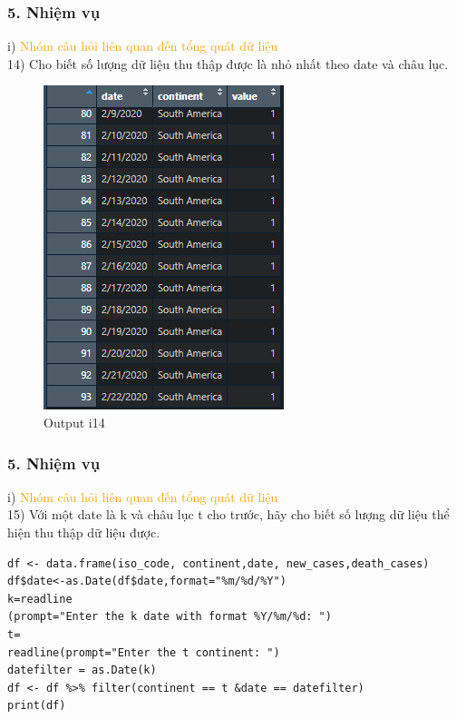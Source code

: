 \documentclass[english,10pt,table]{beamer}
\begin{document}
\begin{frame}[fragile]
\frametitle{5.  Nhiệm vụ}
	i) \textcolor{orange}{Nhóm câu hỏi liên quan đến tổng quát dữ liệu}\\
	14) Cho biết số lượng dữ liệu thu thập được là nhỏ nhất theo date và châu lục.
	\begin{figure}[h!]
	\begin{center}
		    \includegraphics[scale = 0.4]{Images/I/I14.png}
		            \caption{Output i14}
		\end{center}
		\end{figure}
\end{frame}

\begin{frame}[fragile]
\frametitle{5.  Nhiệm vụ}
	i) \textcolor{orange}{Nhóm câu hỏi liên quan đến tổng quát dữ liệu}\\
	15) Với một date là k và châu lục t cho trước, hãy cho biết số lượng dữ liệu thể hiện thu thập dữ liệu được.
		\begin{lstlisting}[frame=single,basicstyle=\tiny]  
df <- data.frame(iso_code, continent,date, new_cases,death_cases)
df$date<-as.Date(df$date,format="%m/%d/%Y") 
k=readline
(prompt="Enter the k date with format %Y/%m/%d: ")
t=
readline(prompt="Enter the t continent: ")
datefilter = as.Date(k)
df <- df %>% filter(continent == t &date == datefilter)
print(df)
	\end{lstlisting}
\end{frame}
\end{document}
